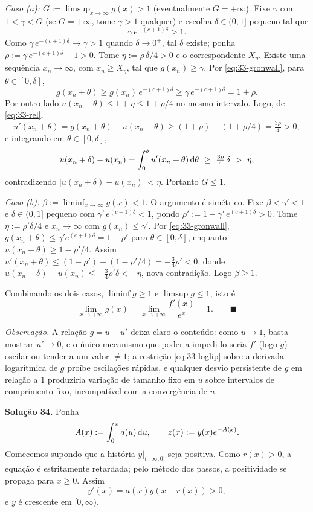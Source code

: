 \emph{Caso (a): $G:=\limsup_{x\to\infty}g(x)>1$} (eventualmente $G=+\infty$). Fixe $\gamma$ com $1<\gamma<G$ (se $G=+\infty$, tome $\gamma>1$ qualquer) e escolha $\delta\in(0,1]$ pequeno tal que
\[
\gamma\,e^{-(c+1)\delta}>1.
\]
Como $\gamma\,e^{-(c+1)\delta}\to\gamma>1$ quando $\delta\to0^+$, tal $\delta$ existe; ponha $\rho:=\gamma\,e^{-(c+1)\delta}-1>0$. Tome $\eta:=\rho\,\delta/4>0$ e o correspondente $X_\eta$. Existe uma sequência $x_n\to\infty$, com $x_n\ge X_\eta$, tal que $g(x_n)\ge\gamma$. Por \eqref{eq:33-gronwall}, para $\theta\in[0,\delta]$,
\[
g(x_n+\theta)\ge g(x_n)\,e^{-(c+1)\delta}\ge \gamma\,e^{-(c+1)\delta}=1+\rho.
\]
Por outro lado $u(x_n+\theta)\le 1+\eta\le 1+\rho/4$ no mesmo intervalo. Logo, de \eqref{eq:33-rel},
\[
u'(x_n+\theta)=g(x_n+\theta)-u(x_n+\theta)\ge (1+\rho)-(1+\rho/4)=\tfrac{3\rho}{4}>0,
\]
e integrando em $\theta\in[0,\delta]$,
\[
u(x_n+\delta)-u(x_n)=\int_0^\delta u'(x_n+\theta)\,\d\theta\ \ge\ \tfrac{3\rho}{4}\,\delta\ >\ \eta,
\]
contradizendo $|u(x_n+\delta)-u(x_n)|<\eta$. Portanto $G\le 1$.

\emph{Caso (b): $\beta:=\liminf_{x\to\infty}g(x)<1$.} O argumento é simétrico. Fixe $\beta<\gamma'<1$ e $\delta\in(0,1]$ pequeno com $\gamma'\,e^{(c+1)\delta}<1$, pondo $\rho':=1-\gamma'\,e^{(c+1)\delta}>0$. Tome $\eta:=\rho'\delta/4$ e $x_n\to\infty$ com $g(x_n)\le\gamma'$. Por \eqref{eq:33-gronwall}, $g(x_n+\theta)\le\gamma'e^{(c+1)\delta}=1-\rho'$ para $\theta\in[0,\delta]$, enquanto $u(x_n+\theta)\ge1-\rho'/4$. Assim $u'(x_n+\theta)\le(1-\rho')-(1-\rho'/4)=-\tfrac34\rho'<0$, donde $u(x_n+\delta)-u(x_n)\le-\tfrac34\rho'\delta<-\eta$, nova contradição. Logo $\beta\ge1$.

Combinando os dois casos, $\liminf g\ge1$ e $\limsup g\le1$, isto é
\[
\lim_{x\to+\infty}g(x)=\lim_{x\to+\infty}\frac{f'(x)}{e^{x}}=1. \qquad\blacksquare
\]

\medskip
\emph{Observação.} A relação $g=u+u'$ deixa claro o conteúdo: como $u\to1$, basta mostrar $u'\to0$, e o único mecanismo que poderia impedi-lo seria $f'$ (logo $g$) oscilar ou tender a um valor $\ne1$; a restrição \eqref{eq:33-loglip} sobre a derivada logarítmica de $g$ proíbe oscilações rápidas, e qualquer desvio persistente de $g$ em relação a $1$ produziria variação de tamanho fixo em $u$ sobre intervalos de comprimento fixo, incompatível com a convergência de $u$.


\bigskip\noindent\textbf{Solução 34.}\quad
Ponha
\[
    A(x):=\int_0^x a(u)\,\mathrm{d} u,
    \qquad
    z(x):=y(x)e^{-A(x)}.
\]
Comecemos supondo que a história $y|_{(-\infty,0]}$ seja positiva. Como
$r(x)>0$, a equação é estritamente retardada; pelo método dos passos, a
positividade se propaga para $x\ge0$. Assim
\[
    y'(x)=a(x)y(x-r(x))>0,
\]
e $y$ é crescente em $[0,\infty)$.

